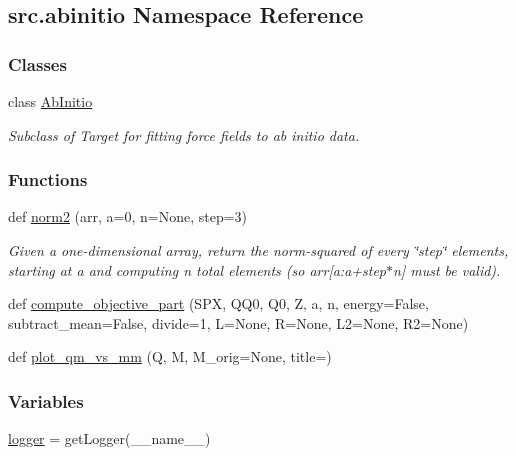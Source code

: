 \hypertarget{namespacesrc_1_1abinitio}{}\subsection{src.\+abinitio Namespace Reference}
\label{namespacesrc_1_1abinitio}
\subsubsection*{Classes}
\begin{DoxyCompactItemize}
\item 
class \hyperlink{classsrc_1_1abinitio_1_1AbInitio}{Ab\+Initio}
\begin{DoxyCompactList}\small\item\em Subclass of Target for fitting force fields to ab initio data. \end{DoxyCompactList}\end{DoxyCompactItemize}
\subsubsection*{Functions}
\begin{DoxyCompactItemize}
\item 
def \hyperlink{namespacesrc_1_1abinitio_ae5e4372a8a2b6ae643c954f1717761a5}{norm2} (arr, a=0, n=None, step=3)
\begin{DoxyCompactList}\small\item\em Given a one-\/dimensional array, return the norm-\/squared of every \char`\"{}step\char`\"{} elements, starting at \textquotesingle{}a\textquotesingle{} and computing \textquotesingle{}n\textquotesingle{} total elements (so arr\mbox{[}a\+:a+step$\ast$n\mbox{]} must be valid). \end{DoxyCompactList}\item 
def \hyperlink{namespacesrc_1_1abinitio_ace4aca44aab54100556205a5aeab3cad}{compute\+\_\+objective\+\_\+part} (S\+PX, Q\+Q0, Q0, Z, a, n, energy=False, subtract\+\_\+mean=False, divide=1, L=None, R=None, L2=None, R2=None)
\item 
def \hyperlink{namespacesrc_1_1abinitio_a15ff594ec7734a01ef603b9bb780d966}{plot\+\_\+qm\+\_\+vs\+\_\+mm} (Q, M, M\+\_\+orig=None, title=\textquotesingle{}\textquotesingle{})
\end{DoxyCompactItemize}
\subsubsection*{Variables}
\begin{DoxyCompactItemize}
\item 
\hyperlink{namespacesrc_1_1abinitio_a5f31a5792044a3fac63afc0cf112ac9c}{logger} = get\+Logger(\+\_\+\+\_\+name\+\_\+\+\_\+)
\end{DoxyCompactItemize}


